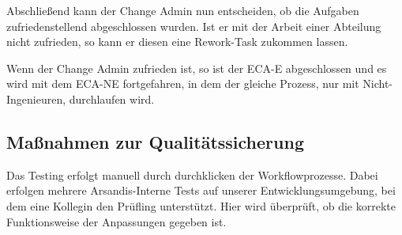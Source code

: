 Abschließend kann der Change Admin nun entscheiden, ob die Aufgaben zufriedenstellend abgeschlossen wurden.
Ist er mit der Arbeit einer Abteilung nicht zufrieden, so kann er diesen eine \glqq Rework\grqq{}-Task zukommen lassen.

Wenn der Change Admin zufrieden ist, so ist der ECA-E abgeschlossen und es wird mit dem ECA-NE fortgefahren, in dem der gleiche Prozess, nur mit Nicht-Ingenieuren, durchlaufen wird.


\subsection{Maßnahmen zur Qualitätssicherung}
Das Testing erfolgt manuell durch \glqq durchklicken\grqq{} der Workflowprozesse.
Dabei erfolgen mehrere Arsandis-Interne Tests auf unserer Entwicklungsumgebung, bei dem eine Kollegin den Prüfling unterstützt.
Hier wird überprüft, ob die korrekte Funktionsweise der Anpassungen gegeben ist.